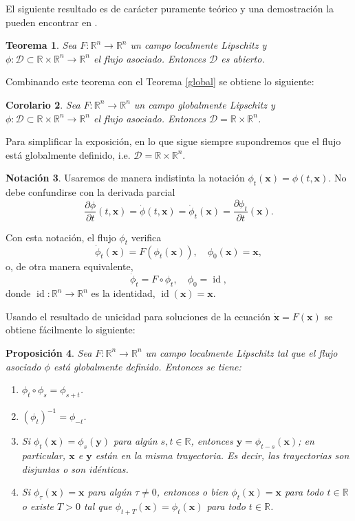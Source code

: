 \documentclass[12pt, a4paper]{amsbook}
\newcommand{\id}{\operatorname{id}}
\newcommand{\R}{{\mathbb R}}
\newcommand{\D}{{\mathcal D}}
\newcommand{\xx}{{\mathbf x}}
\newcommand{\yy}{{\mathbf y}}
\newtheorem{teo}{Teorema}[section]
\newtheorem{prop}[teo]{Proposición}
\newtheorem{cor}[teo]{Corolario}
\theoremstyle{remark}
\theoremstyle{definition}
\newtheorem{nota}[teo]{Notación}
\numberwithin{section}{chapter}
\numberwithin{subsection}{section}
\numberwithin{equation}{section}
\numberwithin{figure}{chapter}
\begin{document}
El siguiente resultado es de carácter puramente teórico y una demostración la pueden encontrar en \cite{Coddington}.
\begin{teo}
Sea $F\colon \R^n\to\R^n$ un campo localmente Lipschitz y $\phi\colon \D\subset \R\times\R^n\to \R^n$ el flujo asociado. Entonces $\D$ es abierto.
\end{teo}

Combinando este teorema con el Teorema \ref{global} se obtiene lo siguiente:
\begin{cor}
Sea $F\colon \R^n\to\R^n$ un campo globalmente Lipschitz y $\phi\colon \D\subset \R\times\R^n\to \R^n$ el flujo asociado. Entonces $\D = \R\times\R^n$.
\end{cor}

Para simplificar la exposición, en lo que sigue siempre supondremos que el flujo está globalmente definido, i.e. $\D = \R\times\R^n$.

\begin{nota}
Usaremos de manera indistinta la notación $\phi_t(\xx) = \phi(t, \xx)$. No debe confundirse con la derivada parcial
$$
\frac{\partial\phi}{\partial t}(t, \xx) = \dot\phi(t, \xx) = \dot \phi_t(\xx) = \frac{\partial \phi_t}{\partial t}(\xx).
$$
\end{nota}

Con esta notación, el flujo $\phi_t$ verifica
$$
\dot \phi_t(\xx) = F(\phi_t(\xx)),\quad \phi_0(\xx) = \xx,
$$
o, de otra manera equivalente,
$$
\dot \phi_t = F\circ \phi_t,\quad \phi_0 = \id,
$$
donde $\id\colon \R^n\to\R^n$ es la identidad, $\id(\xx) = \xx$.

Usando el resultado de unicidad para soluciones de la ecuación $\dot\xx = F(\xx)$ se obtiene fácilmente lo siguiente:
\begin{prop}
Sea $F\colon \R^n\to\R^n$ un campo localmente Lipschitz tal que el flujo asociado $\phi$ está globalmente definido. Entonces se tiene:
\begin{enumerate}
\item $\phi_t\circ\phi_s = \phi_{s+t}$.

\item $(\phi_t)^{-1} = \phi_{-t}$.

\item Si $\phi_t(\xx)=\phi_s(\yy)$ para algún $s, t\in\R$, entonces $\yy=\phi_{t-s}(\xx)$; en particular, $\xx$ e $\yy$ están en la misma trayectoria. Es decir, las trayectorias son disjuntas o son idénticas.

\item Si $\phi_\tau(\xx)=\xx$ para algún $\tau\neq 0$, entonces o bien $\phi_t(\xx)=\xx$ para todo $t\in\R$ o existe $T>0$ tal que $\phi_{t+T}(\xx) = \phi_t(\xx)$ para todo $t\in\R$.
\end{enumerate}
\end{prop}
\end{document}
